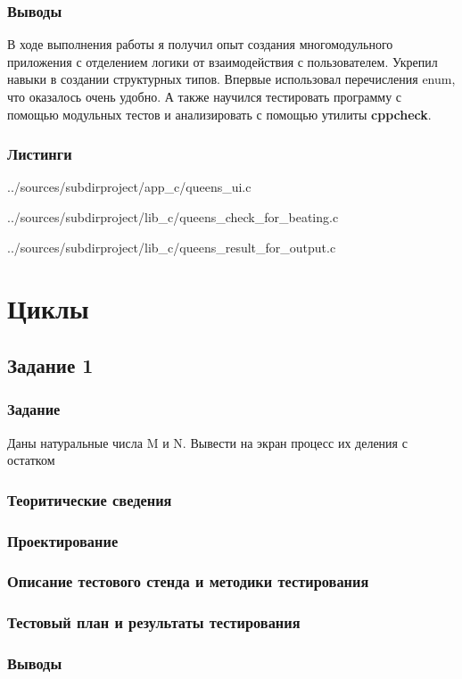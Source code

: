 \documentclass[12pt,a4paper]{report}
\begin{document}
\subsection{Выводы}
В ходе выполнения работы я получил опыт создания многомодульного приложения с отделением логики от взаимодействия с пользователем. Укрепил навыки в создании структурных типов. Впервые использовал перечисления enum, что оказалось очень удобно. А также научился тестировать программу с помощью модульных тестов и анализировать с помощью утилиты \textbf{cppcheck}.
\subsection*{Листинги}

{../sources/subdirproject/app_c/queens_ui.c}


{../sources/subdirproject/lib_c/queens_check_for_beating.c}


{../sources/subdirproject/lib_c/queens_result_for_output.c}
\chapter{Циклы}
\section{Задание 1}
\subsection{Задание}
Даны натуральные числа M и N. Вывести на экран процесс их деления с остатком
\subsection{Теоритические сведения}

\subsection{Проектирование}
\subsection{Описание тестового стенда и методики тестирования}

\subsection{Тестовый план и результаты тестирования}
\subsection{Выводы}
\end{document}

